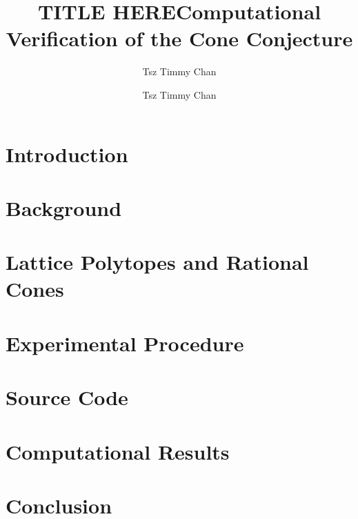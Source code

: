 \documentclass{TC}
\title{TITLE HERE}	%
\author{Tsz Timmy Chan}	%
\title{Computational Verification of the Cone Conjecture}	%
\author{Tsz Timmy Chan}	%
\begin{document}
\chapter{Introduction}

\chapter{Background}


\chapter{Lattice Polytopes and Rational Cones}



%

%



\chapter{Experimental Procedure}


\chapter{Source Code} \label{Source}


\chapter{Computational Results}



\chapter{Conclusion}



%
\end{document}
